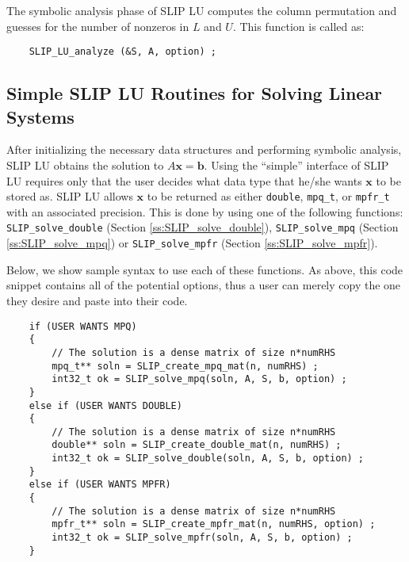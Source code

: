 \documentclass[12pt]{article}
\theoremstyle{definition}
\begin{document}
The symbolic analysis phase of SLIP LU computes the column permutation and
guesses for the number of nonzeros in $L$ and $U$. This function is called as:

{\small
    \begin{verbatim}
    SLIP_LU_analyze (&S, A, option) ; \end{verbatim} }

\cprotect\subsection{Simple SLIP LU Routines for Solving Linear Systems}
\label{s:Using:simple}

After initializing the necessary data structures and performing symbolic
analysis, SLIP LU obtains the solution to $A \mathbf{x} = \mathbf{b}$. Using
the ``simple'' interface of SLIP LU requires only that the user decides what data
type that he/she wants $\mathbf{x}$ to be stored as. SLIP LU allows
$\mathbf{x}$ to be returned as either \verb|double|, \verb|mpq_t|, or
\verb|mpfr_t| with an associated precision. This is done by using one of the
following functions: \verb|SLIP_solve_double| (Section
\ref{ss:SLIP_solve_double}), \verb|SLIP_solve_mpq| (Section
\ref{ss:SLIP_solve_mpq}) or \verb|SLIP_solve_mpfr| (Section
\ref{ss:SLIP_solve_mpfr}).

Below, we show sample syntax to use each of these functions. As above, this
code snippet contains all of the potential options, thus a user can merely copy
the one they desire and paste into their code.

{\small
\begin{verbatim}
    if (USER WANTS MPQ)
    {
        // The solution is a dense matrix of size n*numRHS
        mpq_t** soln = SLIP_create_mpq_mat(n, numRHS) ;
        int32_t ok = SLIP_solve_mpq(soln, A, S, b, option) ;
    }
    else if (USER WANTS DOUBLE)
    {
        // The solution is a dense matrix of size n*numRHS
        double** soln = SLIP_create_double_mat(n, numRHS) ;
        int32_t ok = SLIP_solve_double(soln, A, S, b, option) ;
    }
    else if (USER WANTS MPFR)
    {
        // The solution is a dense matrix of size n*numRHS
        mpfr_t** soln = SLIP_create_mpfr_mat(n, numRHS, option) ;
        int32_t ok = SLIP_solve_mpfr(soln, A, S, b, option) ;
    } \end{verbatim} }
\end{document}
